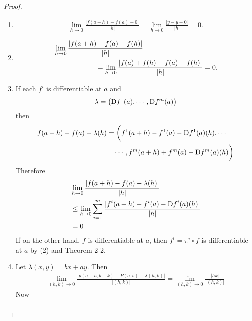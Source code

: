 \begin{proof}
    \begin{enumerate}[label={\upshape(\arabic*)}]
        \item 
            \begin{align*}
                \lim_{h\to0}\frac{\left|f(a+h)-f(a)-0\right|}{|h|}=\lim_{h\to0}\frac{|y-y-0|}{|h|}=0.        
            \end{align*}
        \item 
            \begin{align*}
                &\lim_{h\to0}\frac{\left|f(a+h)-f(a)-f(h)\right|}{|h|} \\
                &\hspace*{6em} = \lim_{h\to0}\frac{|f(a) + f(h) - f(a) - f(h)|}{|h|}=0.
            \end{align*}
        \item If each $f^i$ is differentiable at $a$ and
            \begin{align*}
                \lambda = \left(\mathrm{D}f^1(a), \cdots, \mathrm{D}f^m(a)\right)
            \end{align*}
            then 
            \begin{align*}
                f(a+h) - f(a) -\lambda(h) 
                & = \bigg(f^1(a+h) - f^1(a) - \mathrm{D}f^1(a)(h), \cdots \\
                & \quad\cdots,f^m(a+h) + f^m(a) - \mathrm{D}f^m(a)(h)\bigg) 
            \end{align*}
            Therefore 
            \begin{align*}
                & \lim_{h\to 0}{\frac{|f(a+h) - f(a) - \lambda(h)|}{|h|}} \\
                & \le \lim_{h\to 0}{\sum_{i=1 }^{m}{\frac{\displaystyle |f^i(a+h) - f^i(a) - \mathrm{D}f^i(a)(h)|}{|h|}}} \\
                & = 0
            \end{align*}
            If on the other hand, $f$ is differentiable at $a$, then $f^i = \pi^i\circ f$ is differentiable at $a$ 
            by (2) and Theorem 2-2.
        \item Let $\lambda(x, y) = bx + ay$. Then 
            \begin{align*}
                \lim_{(h, k)\to 0}{\frac{|p(a+h, b+k) - P(a, b) - \lambda(h, k)|}{|(h, k)|}} 
                = \lim_{(h, k)\to 0}{\frac{|hk|}{|(h, k)|}}
            \end{align*}
            Now 
            \begin{align*}

\end{align*}
\end{enumerate}
\end{proof}
